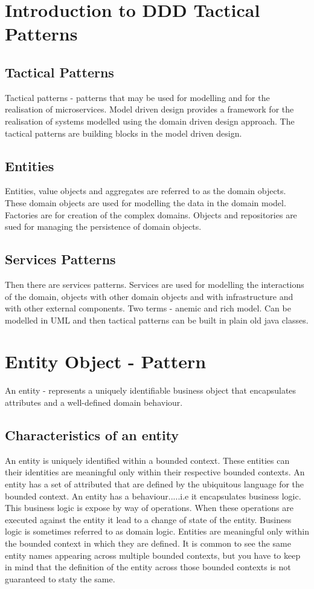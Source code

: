 
\section{Introduction to DDD Tactical Patterns}
\subsection{Tactical Patterns}
Tactical patterns - patterns that may be used for modelling and for the realisation of microservices.
Model driven design provides a framework for the realisation of systems modelled using the domain driven design approach.
The tactical patterns are building blocks in the model driven design.

\subsection{Entities}
Entities, value objects and aggregates are referred to as the domain objects.
These domain objects are used for modelling the data in the domain model.
Factories are for creation of the complex domains.
Objects and repositories are sued for managing the persistence of domain objects.

\subsection{Services Patterns}
Then there are services patterns.
Services are used for modelling the interactions of the domain, objects with other domain objects and with infrastructure and with other external components. %
Two terms - anemic and rich model.
Can be modelled in UML and then tactical patterns can be built in plain old java classes.

\section{Entity Object - Pattern}

An entity - represents a uniquely identifiable business object that encapsulates attributes and a well-defined domain behaviour.

\subsection{Characteristics of an entity}
An entity is uniquely identified within a bounded context.
These entities can their identities are meaningful only within their respective bounded contexts.
An entity has a set of attributed that are defined by the ubiquitous language for the bounded context.
An entity has a behaviour.....i.e it encapsulates business logic.
This business logic is expose by way of operations.
When these operations are executed against the entity it lead to a change of state of the entity.
Business logic is sometimes referred to as domain logic.
Entities are meaningful only within the bounded context in which they are defined.
It is common to see the same entity names appearing across multiple bounded contexts,
but you have to keep in mind that the definition of the entity across those bounded contexts is not guaranteed to staty the same.

